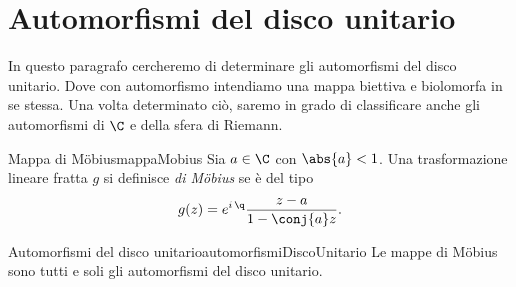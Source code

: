 \section{Automorfismi del disco unitario}

In questo paragrafo cercheremo di determinare gli automorfismi del disco unitario. Dove con automorfismo intendiamo una mappa biettiva e biolomorfa in se stessa.
Una volta determinato ciò, saremo in grado di classificare anche gli automorfismi di \(\C\) e della sfera di Riemann.

\begin{defn}{Mappa di M\"obius}{mappaMobius}
	Sia \(a\in \C\) con \(\abs{a}<1\). Una trasformazione lineare fratta \(g\) si definisce \emph{di M\"obius} se è del tipo
	\[
		g(z) = e^{i\,\q}\frac{z-a}{1-\conj{a}z}.
	\]
\end{defn}

\begin{teor}{Automorfismi del disco unitario}{automorfismiDiscoUnitario}
	Le mappe di M\"obius sono tutti e soli gli automorfismi del disco unitario.
\end{teor}

